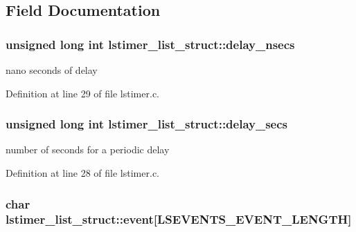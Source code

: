 \subsection{Field Documentation}
\hypertarget{structlstimer__list__struct_acb0c6a1600c4168e5dfb2d477a685b29}{
\subsubsection[{delay\-\_\-nsecs}]{\setlength{\rightskip}{0pt plus 5cm}unsigned long int lstimer\-\_\-list\-\_\-struct\-::delay\-\_\-nsecs}}\label{structlstimer__list__struct_acb0c6a1600c4168e5dfb2d477a685b29}


nano seconds of delay 



Definition at line 29 of file lstimer.\-c.

\hypertarget{structlstimer__list__struct_a237da48d81b7e039c54901296aeee18e}{
\subsubsection[{delay\-\_\-secs}]{\setlength{\rightskip}{0pt plus 5cm}unsigned long int lstimer\-\_\-list\-\_\-struct\-::delay\-\_\-secs}}\label{structlstimer__list__struct_a237da48d81b7e039c54901296aeee18e}


number of seconds for a periodic delay 



Definition at line 28 of file lstimer.\-c.

\hypertarget{structlstimer__list__struct_a54d564e392315b2730278bb925803184}{
\subsubsection[{event}]{\setlength{\rightskip}{0pt plus 5cm}char lstimer\-\_\-list\-\_\-struct\-::event\mbox{[}{\bf L\-S\-E\-V\-E\-N\-T\-S\-\_\-\-E\-V\-E\-N\-T\-\_\-\-L\-E\-N\-G\-T\-H}\mbox{]}}}\label{structlstimer__list__struct_a54d564e392315b2730278bb925803184}


